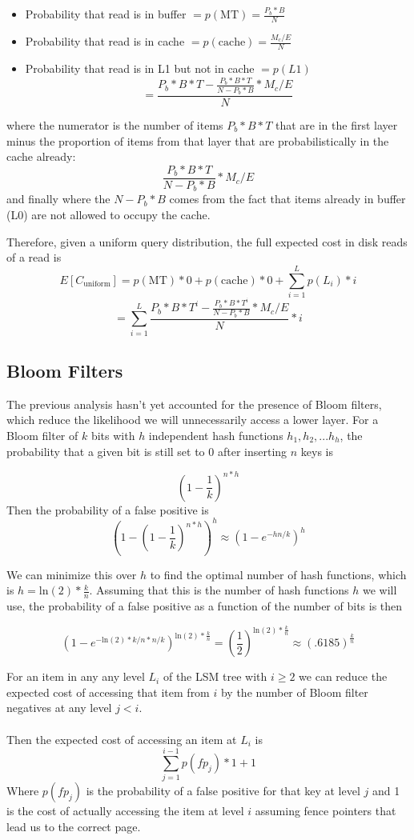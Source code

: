 \documentclass{cidr-2019}
\begin{document}
\begin{itemize}
\item Probability that read is in buffer $= p(\text{MT}) = \frac{P_b*B}{N}$
\item Probability that read is in cache $= p(\text{cache}) = \frac{M_c/E}{N}$
\item Probability that read is in L1 but not in cache $= p(L1)$ $$= \frac{P_b*B * T - \frac{P_b*B*T}{N-P_b*B} * M_c/E}{N}$$
\end{itemize}

where the numerator is the number of items $P_b*B*T$ that are in the first layer
minus the proportion of items from that layer that are probabilistically in the
cache already: $$\frac{P_b*B*T}{N-P_b*B} * M_c/E$$ and finally where the $N-P_b*B$
comes from the fact that items already in buffer (L0) are not allowed to
occupy the cache.

Therefore, given a uniform query distribution, the full expected cost in disk
reads of a read is
$$E[C_{\text{uniform}}] = p(\text{MT}) * 0  + p(\text{cache}) * 0 + \sum_{i=1}^L p(L_i) * i$$
$$=\sum_{i=1}^L \frac{P_b*B * T^i - \frac{P_b*B*T^i}{N-P_b*B} * M_c/E}{N} * i$$


\subsection{Bloom Filters}

The previous analysis hasn't yet accounted for the presence of Bloom filters,
which reduce the likelihood we will unnecessarily access a lower layer. For a
Bloom filter of $k$ bits with $h$ independent hash functions $h_1, h_2,...h_h$,
the probability that a given bit is still set to 0 after inserting $n$ keys is 

$$
(1 - \frac{1}{k})^{n*h}
$$
Then the probability of a false positive is 
$$
(1- (1 - \frac{1}{k})^{n*h})^h \approx (1 - e^{-hn/k})^h
$$

We can minimize this over $h$ to find the optimal number of hash functions,
which is $h = \mathrm{ln}(2) * \frac{k}{n}$. Assuming that this is the number
of hash functions $h$ we will use, the probability of a false positive as a
function of the number of bits is then 

$$
(1 - e^{-\mathrm{ln}(2)*k/n*n/k})^{\mathrm{ln}(2) * \frac{k}{n}} = (\frac{1}{2}) ^ {\mathrm{ln}(2) * \frac{k}{n}} \approx (.6185) ^  {\frac{k}{n}}
$$

For an item in any any level $L_i$ of the LSM tree with $i \geq 2$ we can
reduce the expected cost of accessing that item from $i$ by the number of Bloom
filter negatives at any level $j<i$. \\ \\ Then the expected cost of accessing
an item at $L_i$ is  $$\sum_{j=1}^{i-1} p(fp_j) * 1 + 1$$ Where $p(fp_j)$ is
the probability of a false positive for that key at level $j$ and 1 is the cost
of actually accessing the item at level $i$ assuming fence pointers that lead
us to the correct page.
\end{document}
